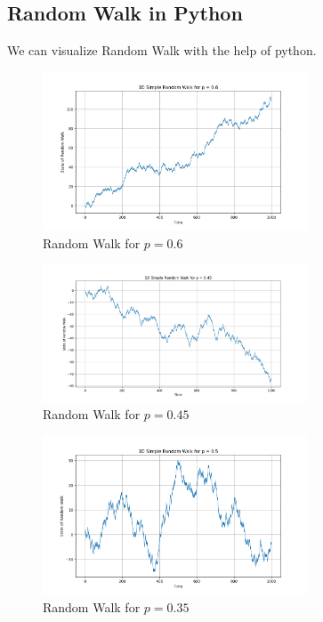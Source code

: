 \subsection{Random Walk in Python}
We can visualize Random Walk with the help of python.

\begin{figure}[H]
    \centering
    \includegraphics[width=0.7\textwidth]{pic/Random_Walk_0.6.png}
    \caption{Random Walk for $p=0.6$}
    \label{fig:0.6}
\end{figure}
\begin{figure}[H]
    \centering
    \includegraphics[width=0.7\textwidth]{pic/Random_Walk_0.45.png}
    \caption{Random Walk for $p=0.45$}
    \label{fig:0.45}
\end{figure}


\begin{figure}[H]
    \centering
    \includegraphics[width=0.7\textwidth]{pic/Random_Walk_0.5.png}
    \caption{Random Walk for $p=0.35$}
    \label{fig:0.5}
\end{figure}

